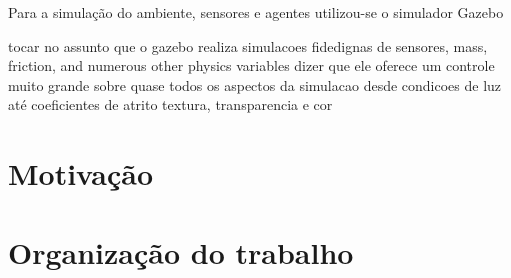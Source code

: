 Para a simulação do ambiente, sensores e agentes utilizou-se o simulador Gazebo \cite{Koenig-2004-394}

tocar no assunto que o gazebo realiza simulacoes fidedignas de sensores, mass, 
friction, and numerous other physics variables
dizer que ele oferece um controle muito grande sobre quase todos os aspectos 
da simulacao desde condicoes de luz até coeficientes de atrito
textura, transparencia e cor

\section{Motivação}

\section{Organização do trabalho}